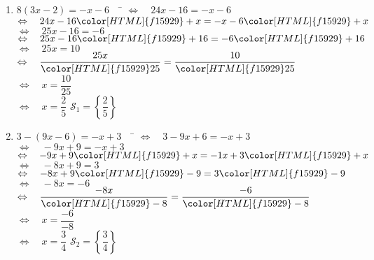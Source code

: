 \documentclass[a4paper,11pt,exos]{nsi} %
\begin{document}
\begin{enumerate}
    \item 	\begin{tabbing}
        $ 8(3x-2)=-x-6 \quad$		\=	$\Leftrightarrow\quad 24x-16=-x-6 $\\
        \>	$\Leftrightarrow\quad	24x-16{\color[HTML]{f15929}+x}=-x-6{\color[HTML]{f15929}+x} $\\
        \>	$\Leftrightarrow\quad	25x-16=-6 $\\
        \>	$\Leftrightarrow\quad  	25x-16{\color[HTML]{f15929}+16}=-6{\color[HTML]{f15929}+16} $\\
        \>	$\Leftrightarrow\quad 	25x=10 $\\
        \>	$\Leftrightarrow\quad	\dfrac{25x}{\color[HTML]{f15929}25}=\dfrac{10}{\color[HTML]{f15929}25} $\\
        \>	$\Leftrightarrow\quad	x=\dfrac{10}{25} $\\
        \>	$\Leftrightarrow\quad	x=\dfrac{2}{5} $	\hspace{4cm} $\mathcal{S}_1=\left\{ \dfrac{2}{5} \right\}$
    \end{tabbing}	


    \item 	\begin{tabbing}
        $ 3-(9x-6)=-x+3 \quad$		\=	$\Leftrightarrow\quad 3-9x+6=-x+3 $\\
        \>	$\Leftrightarrow\quad  -9x+9=-x+3 $\\
        \>	$\Leftrightarrow\quad	-9x+9{\color[HTML]{f15929}+x}=-1x+3{\color[HTML]{f15929}+x} $\\
        \>	$\Leftrightarrow\quad	-8x+9=3 $\\
        \>	$\Leftrightarrow\quad	-8x+9{\color[HTML]{f15929}-9}=3{\color[HTML]{f15929}-9} $\\
        \>	$\Leftrightarrow\quad	-8x=-6 $\\
        \>	$\Leftrightarrow\quad 	\dfrac{-8x}{\color[HTML]{f15929}-8}=\dfrac{-6}{\color[HTML]{f15929}-8}$\\
        \>	$\Leftrightarrow\quad	x=\dfrac{-6}{-8} $\\[.5em]
        \>	$\Leftrightarrow\quad	x=\dfrac{3}{4} $ \hspace{4cm} $\mathcal{S}_2=\left\{ \dfrac{3}{4} \right\}$
    \end{tabbing}
    
    
    

\end{enumerate}
\end{document}
